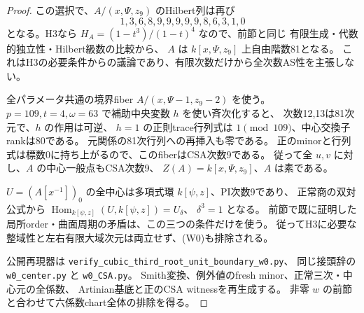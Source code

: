 \begin{proof}
この選択で、$A/(x,\Psi,z_9)$ のHilbert列は再び
\[
 1,3,6,8,9,9,9,9,9,8,6,3,1,0
\]
となる。H3なら $H_A=(1-t^3)/(1-t)^4$ なので、前節と同じ
有限生成・代数的独立性・Hilbert級数の比較から、
$A$ は $k[x,\Psi,z_9]$ 上自由階数81となる。
これはH3の必要条件からの議論であり、有限次数だけから全次数AS性を主張しない。

全パラメータ共通の境界fiber $A/(x,\Psi-1,z_9-2)$ を使う。
$p=109,t=4,\omega=63$ で補助中央変数 $h$ を使い斉次化すると、
次数12,13は81次元で、$h$ の作用は可逆、
$h=1$ の正則trace行列式は $1\pmod {109}$、中心交換子rankは80である。
元関係の81次行列への再挿入も零である。
正のminorと行列式は標数0に持ち上がるので、このfiberはCSA次数9である。
従って全 $u,v$ に対し、$A$ の中心一般点もCSA次数9、
$Z(A)=k[x,\Psi,z_9]$、$A$ は素である。

$U=(A[x^{-1}])_0$ の全中心は多項式環 $k[\psi,z]$、PI次数9であり、
正常商の双対公式から $\operatorname{Hom}_{k[\psi,z]}(U,k[\psi,z])=U_\delta$、
$\delta^3=1$ となる。
前節で既に証明した局所order・曲面周期の矛盾は、この三つの条件だけを使う。
従ってH3に必要な整域性と左右有限大域次元は両立せず、(W0)も排除される。

公開再現器は \texttt{verify\_cubic\_third\_root\_unit\_boundary\_w0.py}、
同じ接頭辞の \texttt{w0\_center.py} と \texttt{w0\_CSA.py}。
Smith変換、例外値のfresh minor、正常三次・中心元の全係数、
Artinian基底と正のCSA witnessを再生成する。
非零 $w$ の前節と合わせて六係数chart全体の排除を得る。
\end{proof}

